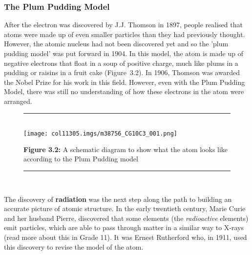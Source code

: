             \subsubsection{ The Plum Pudding Model}
            \nopagebreak
        \label{m38756*id254616}After the electron was discovered by J.J. Thomson in 1897, people realised that atoms were made up of even smaller particles than they had previously thought. However, the atomic nucleus had not been discovered yet and so the 'plum pudding model' was put forward in 1904. In this model, the atom is made up of negative electrons that float in a soup of positive charge, much like plums in a pudding or raisins in a fruit cake (Figure~3.2). In 1906, Thomson was awarded the Nobel Prize for his work in this field. However, even with the Plum Pudding Model, there was still no understanding of how these electrons in the atom were arranged.\par 
    \setcounter{subfigure}{0}
	\begin{figure}[H] %
    \begin{center}
    \rule[.1in]{\figurerulewidth}{.005in} \\
        \label{m38756*uid2!!!underscore!!!media}\label{m38756*uid2!!!underscore!!!printimage}\texttt{[image: col11305.imgs/m38756\_CG10C3\_001.png]} %
      \vspace{2pt}
    \vspace{\rubberspace}\par \begin{cnxcaption}
	  \small \textbf{Figure 3.2: }A schematic diagram to show what the atom looks like according to the Plum Pudding model
	\end{cnxcaption}
    \vspace{.1in}
    \rule[.1in]{\figurerulewidth}{.005in} \\
    \end{center}
 \end{figure}       
        \label{m38756*id254642}The discovery of \textbf{radiation} was the next step along the path to building an accurate picture of atomic structure. In the early twentieth century, Marie Curie and her husband Pierre,  discovered that some elements (the \textsl{radioactive} elements) emit particles, which are able to pass through matter in a similar way to X-rays (read more about this in Grade 11). It was Ernest Rutherford who, in 1911, used this discovery to revise the model of the atom.\par 
